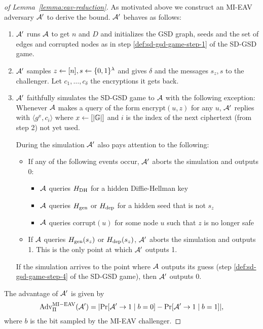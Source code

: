 \begin{proof}[of Lemma~\ref{lemma:eav-reduction}]
	As motivated above we construct an MI-EAV adversary $\mathcal{A}'$ to derive the bound. $\mathcal{A}'$ behaves as follows:
	\begin{enumerate}[1.]
		\item $\mathcal{A}'$ runs $\mathcal{A}$ to get $n$ and $D$ and initializes the GSD graph, seeds and the set of edges and corrupted nodes as in step \ref{def:sd-gsd-game-step-1} of the SD-GSD game.
		\item $\mathcal{A}'$ samples $z \leftarrow [n], s \leftarrow \{0, 1\}^\lambda$ and gives $\delta$ and the messages $s_z, s$ to the challenger. Let $c_1, \ldots, c_\delta$ the encryptions it gets back.
		\item $\mathcal{A}'$ faithfully simulates the SD-GSD game to $\mathcal{A}$ with the following exception: Whenever $\mathcal{A}$ makes a query of the form $\mathrm{encrypt}(u, z)$ for any $u$, $\mathcal{A}'$ replies with $\langle g^x, c_i \rangle$ where $x \leftarrow [\lvert\mathbb{G}\rvert]$ and $i$ is the index of the next ciphertext (from step 2) not yet used.

		      During the simulation $\mathcal{A}'$ also pays attention to the following:
		      \begin{itemize}
			      \item If any of the following events occur, $\mathcal{A}'$ aborts the simulation and outputs 0:
			            \begin{itemize}
				            \item $\mathcal{A}$ queries $H_\mathrm{DH}$ for a hidden Diffie-Hellman key
				            \item $\mathcal{A}$ queries $H_\mathrm{gen}$ or $H_\mathrm{dep}$ for a hidden seed that is not $s_z$
				            \item $\mathcal{A}$ queries $\mathrm{corrupt}(u)$ for some node $u$ such that $z$ is no longer safe
			            \end{itemize}
			      \item If $\mathcal{A}$ queries $H_\mathrm{gen}(s_z)$ or $H_\mathrm{dep}(s_z)$, $\mathcal{A}'$ aborts the simulation and outputs 1. This is the only point at which $\mathcal{A}'$ outputs 1.
		      \end{itemize}

		      If the simulation arrives to the point where $\mathcal{A}$ outputs its guess (step \ref{def:sd-gsd-game-step-4} of the SD-GSD game), then $\mathcal{A}'$ outputs 0.
	\end{enumerate}

	The advantage of $\mathcal{A}'$ is given by
	\begin{equation} \label{eq:lemma-eav-reduction-advantage}
		\mathrm{Adv}_{\Pi}^{\mathrm{MI-EAV}}(\adv') = \abs*{\pr{\adv' \to 1 \mid b = 0} - \pr{\adv' \to 1 \mid b = 1}},
	\end{equation}
	where $b$ is the bit sampled by the MI-EAV challenger.



\end{proof}
